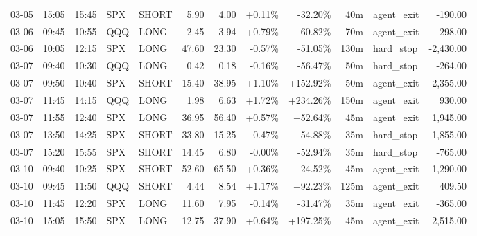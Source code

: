 \documentclass[11pt,a4paper,twoside]{article}
\begin{document}
\begin{center}
\begin{longtable}{>{\color{txtmain}}l l l l l r r r r r >{\color{txtmain}}l r}
03-05 & 15:05 & 15:45 & SPX & SHORT & 5.90 & 4.00 & \textcolor{wingreen}{+0.11\%} & \textcolor{lossred}{-32.20\%} & 40m & agent\_exit & \textcolor{lossred}{-190.00} \\
03-06 & 09:45 & 10:55 & QQQ & LONG & 2.45 & 3.94 & \textcolor{wingreen}{+0.79\%} & \textcolor{wingreen}{+60.82\%} & 70m & agent\_exit & \textcolor{wingreen}{298.00} \\
03-06 & 10:05 & 12:15 & SPX & LONG & 47.60 & 23.30 & \textcolor{lossred}{-0.57\%} & \textcolor{lossred}{-51.05\%} & 130m & hard\_stop & \textcolor{lossred}{-2,430.00} \\
03-07 & 09:40 & 10:30 & QQQ & LONG & 0.42 & 0.18 & \textcolor{lossred}{-0.16\%} & \textcolor{lossred}{-56.47\%} & 50m & hard\_stop & \textcolor{lossred}{-264.00} \\
03-07 & 09:50 & 10:40 & SPX & SHORT & 15.40 & 38.95 & \textcolor{wingreen}{+1.10\%} & \textcolor{wingreen}{+152.92\%} & 50m & agent\_exit & \textcolor{wingreen}{2,355.00} \\
03-07 & 11:45 & 14:15 & QQQ & LONG & 1.98 & 6.63 & \textcolor{wingreen}{+1.72\%} & \textcolor{wingreen}{+234.26\%} & 150m & agent\_exit & \textcolor{wingreen}{930.00} \\
03-07 & 11:55 & 12:40 & SPX & LONG & 36.95 & 56.40 & \textcolor{wingreen}{+0.57\%} & \textcolor{wingreen}{+52.64\%} & 45m & agent\_exit & \textcolor{wingreen}{1,945.00} \\
03-07 & 13:50 & 14:25 & SPX & SHORT & 33.80 & 15.25 & \textcolor{lossred}{-0.47\%} & \textcolor{lossred}{-54.88\%} & 35m & hard\_stop & \textcolor{lossred}{-1,855.00} \\
03-07 & 15:20 & 15:55 & SPX & SHORT & 14.45 & 6.80 & \textcolor{lossred}{-0.00\%} & \textcolor{lossred}{-52.94\%} & 35m & hard\_stop & \textcolor{lossred}{-765.00} \\
03-10 & 09:40 & 10:25 & SPX & SHORT & 52.60 & 65.50 & \textcolor{wingreen}{+0.36\%} & \textcolor{wingreen}{+24.52\%} & 45m & agent\_exit & \textcolor{wingreen}{1,290.00} \\
03-10 & 09:45 & 11:50 & QQQ & SHORT & 4.44 & 8.54 & \textcolor{wingreen}{+1.17\%} & \textcolor{wingreen}{+92.23\%} & 125m & agent\_exit & \textcolor{wingreen}{409.50} \\
03-10 & 11:45 & 12:20 & SPX & LONG & 11.60 & 7.95 & \textcolor{lossred}{-0.14\%} & \textcolor{lossred}{-31.47\%} & 35m & agent\_exit & \textcolor{lossred}{-365.00} \\
03-10 & 15:05 & 15:50 & SPX & LONG & 12.75 & 37.90 & \textcolor{wingreen}{+0.64\%} & \textcolor{wingreen}{+197.25\%} & 45m & agent\_exit & \textcolor{wingreen}{2,515.00} \\

\end{longtable}
\end{center}
\end{document}
